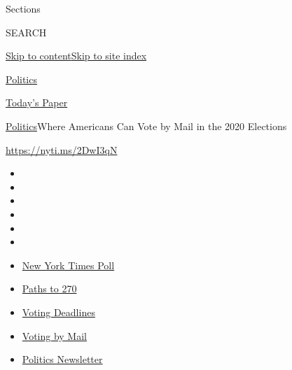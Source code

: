 Sections

SEARCH

\protect\hyperlink{site-content}{Skip to
content}\protect\hyperlink{site-index}{Skip to site index}

\href{https://www.nytimes3xbfgragh.onion/section/politics}{Politics}

\href{https://myaccount.nytimes3xbfgragh.onion/auth/login?response_type=cookie\&client_id=vi}{}

\href{https://www.nytimes3xbfgragh.onion/section/todayspaper}{Today's
Paper}

\href{/section/politics}{Politics}\textbar{}Where Americans Can Vote by
Mail in the 2020 Elections

\url{https://nyti.ms/2DwI3qN}

\begin{itemize}
\item
\item
\item
\item
\item
\item
\end{itemize}

\begin{itemize}
\item
  \href{https://www.nytimes3xbfgragh.onion/2020/09/12/us/politics/biden-trump-poll-wisconsin-minnesota.html?action=click\&pgtype=Article\&state=default\&region=TOP_BANNER\&context=storylines_menu}{New
  York Times Poll}
\item
  \href{https://www.nytimes3xbfgragh.onion/interactive/2020/us/elections/election-states-biden-trump.html?action=click\&pgtype=Article\&state=default\&region=TOP_BANNER\&context=storylines_menu}{Paths
  to 270}
\item
  \href{https://www.nytimes3xbfgragh.onion/interactive/2019/us/elections/2020-presidential-election-calendar.html?action=click\&pgtype=Article\&state=default\&region=TOP_BANNER\&context=storylines_menu}{Voting
  Deadlines}
\item
  \href{https://www.nytimes3xbfgragh.onion/interactive/2020/08/31/us/politics/vote-by-mail-deadlines.html?action=click\&pgtype=Article\&state=default\&region=TOP_BANNER\&context=storylines_menu}{Voting
  by Mail}
\item
  \href{https://www.nytimes3xbfgragh.onion/newsletters/politics?action=click\&pgtype=Article\&state=default\&region=TOP_BANNER\&context=storylines_menu}{Politics
  Newsletter}
\end{itemize}

